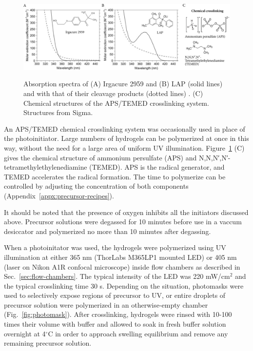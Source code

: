 \begin{figure}
\caption[Photoinitator properties.]{Absorption spectra of (A) Irgacure 2959 and (B) LAP (solid lines) and with that of their cleavage products (dotted lines) \cite{fairbanks09}. (C) Chemical structures of the APS/TEMED crosslinking system. Structures from Sigma.}
\centering
\includegraphics[width=\textwidth]{figs/ch03/initiators}
\label{fig:initiators}
\end{figure}

An APS/TEMED chemical crosslinking system was occasionally used in place of the photoinitiator.  Large numbers of hydrogels can be polymerized at once in this way, without the need for a large area of uniform UV illumination.  Figure~\ref{fig:initiators} (C) gives the chemical structure of ammonium persulfate (APS) and N,N,N′,N′-tetramethylethylenediamine (TEMED).  APS is the radical generator, and TEMED accelerates the radical formation.  The time to polymerize can be controlled by adjusting the concentration of both components (Appendix~\ref{appx:precursor-recipes}).

It should be noted that the presence of oxygen inhibits all the initiators discussed above.  Precursor solutions were degassed for 10 minutes before use in a vaccum desiccator and polymerized no more than 10 minutes after degassing.

When a photoinitator was used, the hydrogels were polymerized using UV illumination at either 365 nm (ThorLabs M365LP1 mounted LED) or 405 nm (laser on Nikon A1R confocal microscope) inside flow chambers as described in Sec.~\ref{sec:flow-chambers}.  The typical intensity of the LED was 220 mW/cm$^2$ and the typical crosslinking time 30 s.  Depending on the situation, photomasks were used to selectively expose regions of precursor to UV, or entire droplets of precursor solution were polymerized in an otherwise-empty chamber (Fig.~\ref{fig:photomask}).  After crosslinking, hydrogels were rinsed with 10-100 times their volume with buffer and allowed to soak in fresh buffer solution overnight at 4$^\circ$C in order to approach swelling equilibrium and remove any remaining precursor solution.

